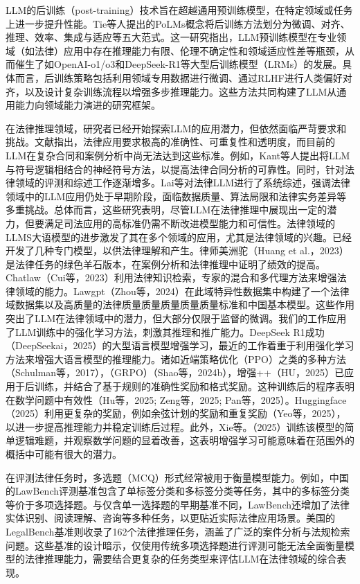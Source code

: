 \documentclass{pkuthesis}
\begin{document}
LLM的后训练（post-training）技术旨在超越通用预训练模型，在特定领域或任务上进一步提升性能。Tie等人提出的PoLMs概念将后训练方法划分为微调、对齐、推理、效率、集成与适应等五大范式。这一研究指出，LLM预训练模型在专业领域（如法律）应用中存在推理能力有限、伦理不确定性和领域适应性差等瓶颈，从而催生了如OpenAI-o1/o3和DeepSeek-R1等大型后训练模型（LRMs）的发展。具体而言，后训练策略包括利用领域专用数据进行微调、通过RLHF进行人类偏好对齐，以及设计复杂训练流程以增强多步推理能力。这些方法共同构建了LLM从通用能力向领域能力演进的研究框架。

在法律推理领域，研究者已经开始探索LLM的应用潜力，但依然面临严苛要求和挑战。文献指出，法律应用要求极高的准确性、可重复性和透明度，而目前的LLM在复杂合同和案例分析中尚无法达到这些标准。例如，Kant等人提出将LLM与符号逻辑相结合的神经符号方法，以提高法律合同分析的可靠性。同时，针对法律领域的评测和综述工作逐渐增多。Lai等对法律LLM进行了系统综述，强调法律领域中的LLM应用仍处于早期阶段，面临数据质量、算法局限和法律实务差异等多重挑战。总体而言，这些研究表明，尽管LLM在法律推理中展现出一定的潜力，但要满足司法应用的高标准仍需不断改进模型能力和可信性。法律领域的LLMS大语模型的进步激发了其在多个领域的应用，尤其是法律领域的兴趣。已经开发了几种专门模型，以供法律理解和产生。律师美洲驼（Huang et al.，2023）是法律任务的绿色羊石版本，在案例分析和法律推理中证明了绩效的提高。Chatlaw（Cui等，2023）利用法律知识检索，专家的混合和多代理方法来增强法律领域的能力。Lawgpt（Zhou等，2024）在此域特异性数据集中构建了一个法律域数据集以及高质量的法律质量质量质量质量质量标准和中国基本模型。这些作用突出了LLM在法律领域中的潜力，但大部分仅限于监督的微调。我们的工作应用了LLM训练中的强化学习方法，刺激其推理和推广能力。DeepSeek R1成功（DeepSeekai，2025）的大型语言模型增强学习，最近的工作着重于利用强化学习方法来增强大语言模型的推理能力。诸如近端策略优化（PPO）之类的多种方法（Schulman等，2017），（GRPO）（Shao等，2024b），增强++（HU，2025）已应用于后训练，并结合了基于规则的准确性奖励和格式奖励。这种训练后的程序表明在数学问题中有效性（Hu等，2025; Zeng等，2025; Pan等，2025）。Huggingface（2025）利用更复杂的奖励，例如余弦计划的奖励和重复奖励（Yeo等，2025），以进一步提高推理能力并稳定训练后过程。此外，Xie等。（2025）训练该模型的简单逻辑难题，并观察数学问题的显着改善，这表明增强学习可能意味着在范围外的概括中可能有很大的潜力。

在评测法律任务时，多选题（MCQ）形式经常被用于衡量模型能力。例如，中国的LawBench评测基准包含了单标签分类和多标签分类等任务，其中的多标签分类等价于多项选择题。与仅含单一选择题的早期基准不同，LawBench还增加了法律实体识别、阅读理解、咨询等多种任务，以更贴近实际法律应用场景。美国的LegalBench基准则收录了162个法律推理任务，涵盖了广泛的案件分析与法规检索问题。这些基准的设计暗示，仅使用传统多项选择题进行评测可能无法全面衡量模型的法律推理能力，需要结合更复杂的任务类型来评估LLM在法律领域的综合表现。
\end{document}
